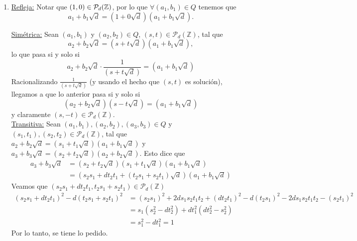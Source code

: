 \begin{sol}
	\begin{enumerate}[label = (\roman*)]
		\item \underline{Refleja:} Notar que $(1, 0) \in \mathcal{P}_d(\mathbb{Z})$, por lo que $\forall (a_1, b_1) \in Q$ tenemos que
		      \[a_1 + b_1\sqrt{d} = (1 + 0\sqrt{d})(a_1 + b_1 \sqrt{d}).\]

		      \underline{Simétrica:} Sean $(a_1, b_1)$ y $(a_2, b_2) \in Q$, $(s, t) \in \mathcal{P}_d(\mathbb{Z})$, tal que
		      \[a_2 + b_2\sqrt{d} = (s + t\sqrt{d})(a_1 + b_1\sqrt{d}),\]
		      lo que pasa si y solo si
		      \[a_2 + b_2\sqrt{d} \cdot \frac{1}{(s + t\sqrt{d})} = (a_1 + b_1\sqrt{d})\]
		      Racionalizando $\frac{1}{(s + t\sqrt{d})}$ (y usando el hecho que $(s, t)$ es solución), llegamos a que lo anterior pasa si y solo si
		      \[
			      (a_2 + b_2 \sqrt{d})(s - t \sqrt{d}) = (a_1 + b_1 \sqrt{d})
		      \]
		      y claramente $(s, -t) \in \mathcal{P}_d (\mathbb{Z})$. \\

		      \underline{Transitiva:} Sean $(a_1, b_1), (a_2, b_2), (a_3, b_3) \in Q$ y $(s_1, t_1), (s_2, t_2) \in \mathcal{P}_d (\mathbb{Z})$, tal que
		      $a_2 + b_2\sqrt{d} = (s_1 + t_1\sqrt{d})(a_1 + b_1\sqrt{d})$ y $a_3 + b_3\sqrt{d} = (s_2 + t_2\sqrt{d})(a_2 + b_2\sqrt{d})$. Esto dice que
		      \begin{align*}
			      a_3 + b_3\sqrt{d} & = (s_2 + t_2\sqrt{d})(s_1 + t_1\sqrt{d})(a_1 + b_1\sqrt{d})         \\
			                        & = (s_2s_1 + dt_2t_1 + (t_2s_1 + s_2t_1)\sqrt{d})(a_1 + b_1\sqrt{d})
		      \end{align*}
		      Veamos que $(s_2s_1 + dt_2t_1, t_2s_1 + s_2t_1) \in \mathcal{P}_d (\mathbb{Z})$
		      \begin{align*}
			      (s_2s_1 + dt_2t_1)^2 - d(t_2s_1 + s_2t_1)^2 & = (s_2s_1)^2+ 2ds_1s_2t_1t_2 + (dt_2t_1)^2 - d(t_2s_1)^2 -2ds_1s_2t_1t_2 - (s_2t_1)^2 \\
			                                                  & = s_1(s_2^2 - dt_2^2) + dt_1^2(dt_2^2 - s_2^2)                                        \\
			                                                  & = s_1^2 - dt_1^2 = 1
		      \end{align*}
		      Por lo tanto, se tiene lo pedido.


\end{enumerate}
\end{sol}
